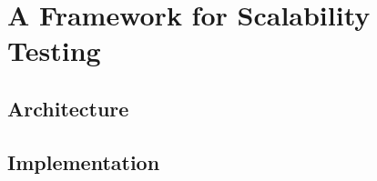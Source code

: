 \section{A Framework for Scalability Testing}

\subsection{Architecture}

\subsection{Implementation}